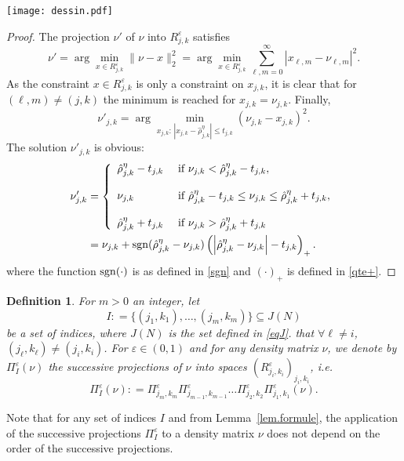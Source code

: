 \documentclass[a4paper]{amsart}
\newtheorem{dfn}{Definition}[section]
\newcommand{\deq}{\mathrel{\mathop:} = } %
\begin{document}
\begin{center}
\texttt{[image: dessin.pdf]}
\end{center}

\begin{proof}
The projection $\nu'$ of $\nu$ into $R_{j,k}^{\varepsilon}$ satisfies
      $$
      \nu' = \arg\min_{x\in R^{\varepsilon}_{j,k}} \|\nu - x\|_{2}^{2}  =
\arg\min_{x\in R^{\varepsilon}_{j,k}} \sum_{\ell,m=0}^{\infty} \left|x_{\ell,m}
- \nu_{\ell,m} \right|^{2} .
      $$
     As the constraint $x\in R^{\varepsilon}_{j,k}$ is only a constraint on
$x_{j,k}$, it is clear that for $(\ell,m)\neq(j,k)$ the minimum is reached for
$x_{j,k}=\nu_{j,k}$. Finally,
    $$
    \nu'_{j,k} = \arg\min_{x_{j,k}:\,|x_{j,k} - \hat{\rho}_{j,k}^{\eta}|\leq
t_{j,k} } (\nu_{j,k} - x_{j,k})^{2}. 
    $$
The solution $\nu'_{j,k}$ is obvious:
             \begin{align*}
                \nu'_{j,k} & = \left\{\begin{array}{l l}
                  \hat{\rho}_{j,k}^{\eta} - t_{j,k} & \text{ if } \nu_{j,k} <
\hat{\rho}_{j,k}^{\eta} - t_{j,k},\\\\
                  \nu_{j,k} & \text{ if } \hat{\rho}_{j,k}^{\eta} - t_{j,k} \leq
\nu_{j,k} \leq  \hat{\rho}_{j,k}^{\eta} + t_{j,k},\\\\
                  \hat{\rho}_{j,k}^{\eta} + t_{j,k} & \text{ if } \nu_{j,k} >
\hat{\rho}_{j,k}^{\eta} + t_{j,k}
                   \end{array}\right.\\
                & = \nu_{j,k} + {\rm sgn} (\hat{\rho}_{j,k}^{\eta} - \nu_{j,k})
                 \left(\left|\hat{\rho}_{j,k}^{\eta} -
\nu_{j,k}\right|-t_{j,k}\right)_{+}.
            \end{align*}
where the function ${\rm sgn}(\cdot)$ is as defined in \eqref{sgn} and $(\cdot)_+$ is
defined in \eqref{qte+}.
\end{proof}





\begin{dfn} 
    For $m>0$ an integer, let 
    $$
    I \deq \{(j_1,k_1),\dots,(j_m,k_m)\}\subseteq J(N)
    $$
    be a set of indices, where $J(N)$ is the set defined in \eqref{eqJ}. %
that $\forall \ell\neq i$, $(j_\ell,k_\ell)\neq (j_i,k_i)$. 
      For $\varepsilon\in(0,1)$ and for any density matrix $\nu$, we denote by
$\Pi_{I}^{\varepsilon}(\nu)$ the successive projections of $\nu$ into spaces
$\left(R_{j_i,k_i}^{\varepsilon}\right)_{j_i,k_i}$, i.e.
      $$
       \Pi_{I}^{\varepsilon}(\nu)\deq\Pi_{j_m,k_m}^{\varepsilon}
\Pi_{j_{m-1},k_{m-1}}^{\varepsilon} \ldots \Pi_{j_2,k_2}^{\varepsilon}
\Pi_{j_1,k_1}^{\varepsilon}( \nu ).
     $$
  \end{dfn}
Note that  for any set of indices $I$ and from Lemma~\ref{lem.formule}, the
application of the successive projections $\Pi_{I}^{\varepsilon}$ to a density
matrix $\nu$
does not depend on the order of the successive projections.
\end{document}
